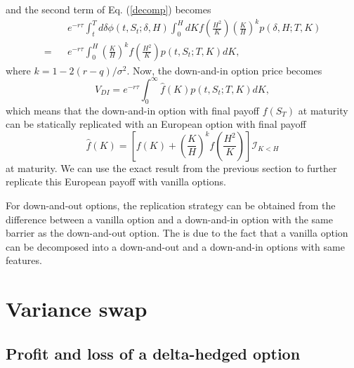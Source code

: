 \documentclass[12pt]{article}
\begin{document}
  and the second term of Eq. (\ref{decomp}) becomes
  \begin{eqnarray}
      &&e^{-r\tau}\int_t^Td\delta \phi(t,S_t;\delta,H)\int_0^HdK f\left(\frac{H^2}{K}\right)\left(\frac{K}{H}\right)^kp\left(\delta,H;T,K\right)\nonumber\\
    = &&e^{-r\tau}\int_0^H \left(\frac{K}{H}\right)^kf\left(\frac{H^2}{K}\right)p\left(t, S_t;T,K\right)dK,
  \end{eqnarray}
  where $k=1-2(r-q)/\sigma^2$. Now, the down-and-in option price becomes
  \begin{equation}
    V_{DI} = e^{-r\tau}\int_0^{\infty} \hat{f}(K)p\left(t, S_t;T,K\right)dK,
  \end{equation}
  which means that the down-and-in option with final payoff $f(S_T)$ at maturity can be statically replicated with an European option with final payoff \cite{CarrChou}
  \begin{equation}
    \hat{f}(K) = \left[f(K) + \left(\frac{K}{H}\right)^kf\left(\frac{H^2}{K}\right)\right]\mathcal{I}_{K<H}
  \end{equation}
  at maturity. We can use the exact result from the previous section to further replicate this European payoff with vanilla options.

  For down-and-out options, the replication strategy can be obtained from the difference between a vanilla option and a down-and-in option with the same barrier
  as the down-and-out option. The is due to the fact that a vanilla option can be decomposed into a down-and-out and a down-and-in options with same features.

\section{Variance swap}

  \subsection{Profit and loss of a delta-hedged option}
\end{document}
